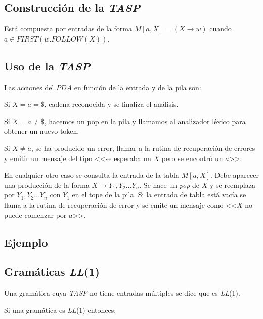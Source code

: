 \subsection{Construcción de la \textit{TASP}}

Está compuesta por entradas de la forma $M[a,X]=(X\rightarrow w)$        cuando 
          $a\in FIRST(w.FOLLOW(X))$.

 
\subsection{Uso de la \textit{TASP}}

Las acciones del $PDA$ en función de la entrada y de
la pila son:

  Si $X=a=\$$, cadena reconocida y se finaliza el análisis.
  
  Si $X=a\neq \$$, hacemos un pop en la pila y llamamos al analizador léxico para obtener un nuevo token.
  
  Si $X\neq a$, se ha producido un error, llamar a la rutina de recuperación de errores y emitir un mensaje del tipo <<se esperaba un $X$ pero se encontró un $ a $>>.
  
  En cualquier otro caso se consulta la entrada de la tabla $M[a,X]$. Debe aparecer una producción de la forma $ X\rightarrow Y_{1},Y_{2}\ldots  Y_{n}$. Se hace un \textit{pop} de $ X$ y se reemplaza por $Y_{1},Y_{2}\ldots Y_{n}$ con $Y_{1}$ en el tope de la pila.
Si la entrada de tabla está vacía se llama a la rutina de recuperación de error y se emite un mensaje como <<$X$ no puede comenzar por $a$>>.

\subsection{Ejemplo}





\subsection{Gramáticas \textit{LL}(1)}

Una gramática cuya \textit{TASP} no tiene entradas múltiples se dice que es \textit{LL}(1).

Si una gramática es \textit{LL}(1) entonces:

